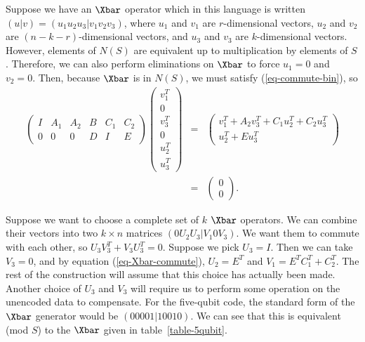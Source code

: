 Suppose we have an $\Xbar$ operator which in this language is written
$(u|v) = (u_1 u_2 u_3| v_1 v_2 v_3)$, where $u_1$ and $v_1$ are
$r$-dimensional vectors, $u_2$ and $v_2$ are $(n-k-r)$-dimensional
vectors, and $u_3$ and $v_3$ are $k$-dimensional vectors.  However,
elements of $N(S)$ are equivalent up to multiplication by elements of $S$.
Therefore, we can also perform eliminations on $\Xbar$ to force $u_1 = 0$
and $v_2 = 0$.  Then, because $\Xbar$ is in $N(S)$, we must satisfy
(\ref{eq-commute-bin}), so
\begin{eqnarray}
	\left( \begin{array}{cccccc}
		       I & A_1 & A_2 & B & C_1 & C_2 \\
		       0 & 0 & 0 & D & I & E
	\end{array} \right)
	\left( \begin{array}{c} v_1^T \\ 0 \\ v_3^T \\ 0 \\ u_2^T \\ u_3^T
	\end{array} \right)
	& \!\!\! = & \!\!\! \left( \begin{array}{c}
		                           v_1^T + A_2 v_3^T + C_1 u_2^T + C_2 u_3^T \\
		                           u_2^T + E u_3^T
	\end{array} \right) \nonumber \\
	& \!\!\! = & \!\!\! \left( \begin{array}{c} 0 \\ 0 \end{array} \right).
	\label{eq-Xbar-commute}
\end{eqnarray}

Suppose we want to choose a complete set of $k$ $\Xbar$ operators.  We
can combine their vectors into two $k \times n$ matrices $(0 U_2 U_3 |
V_1 0 V_3)$.  We want them to commute with each other, so $U_3 V_3^T +
V_3 U_3^T = 0$.  Suppose we pick $U_3 = I$.  Then we can take $V_3 = 0$, and
by equation (\ref{eq-Xbar-commute}), $U_2 = E^T$ and $V_1 = E^T C_1^T + C_2^T$.
The rest of the construction will assume that this choice has actually been
made.  Another choice of $U_3$ and $V_3$ will require us to perform some
operation on the unencoded data to compensate.  For the five-qubit code, the
standard form of the $\Xbar$ generator would be $(0 0 0 0 1 | 1 0 0 1 0)$.
We can see that this is equivalent (mod $S$) to the $\Xbar$ given in
table~\ref{table-5qubit}.


